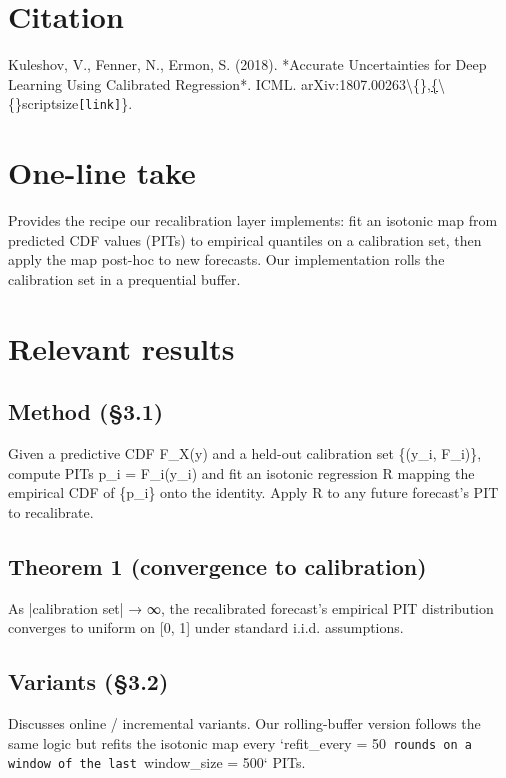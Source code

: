 \documentclass[11pt,a4paper,openany]{report}
\begin{document}
\section{Citation}

Kuleshov, V., Fenner, N., Ermon, S. (2018). *Accurate Uncertainties for
Deep Learning Using Calibrated Regression*. ICML.
arXiv:1807.00263\textbackslash\{\},\href{https://arxiv.org/abs/1807.00263}\{\textbackslash\{\}scriptsize\texttt{[link]}\}.

\section{One-line take}

Provides the recipe our recalibration layer implements: fit an
isotonic map from predicted CDF values (PITs) to empirical quantiles
on a calibration set, then apply the map post-hoc to new forecasts.
Our implementation rolls the calibration set in a prequential buffer.

\section{Relevant results}

\subsection{Method (§3.1)}

Given a predictive CDF F\_X(y) and a held-out calibration set
\{(y\_i, F\_i)\}, compute PITs p\_i = F\_i(y\_i) and fit an isotonic
regression R mapping the empirical CDF of \{p\_i\} onto the identity.
Apply R to any future forecast's PIT to recalibrate.

\subsection{Theorem 1 (convergence to calibration)}

As |calibration set| → ∞, the recalibrated forecast's empirical PIT
distribution converges to uniform on [0, 1] under standard i.i.d.
assumptions.

\subsection{Variants (§3.2)}

Discusses online / incremental variants. Our rolling-buffer version
follows the same logic but refits the isotonic map every `refit\_every
= 50\texttt{ rounds on a window of the last }window\_size = 500` PITs.
\end{document}
